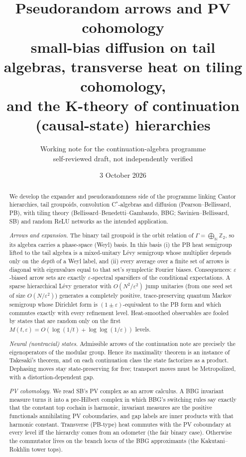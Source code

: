 \documentclass[11pt]{article}
\title{Pseudorandom arrows and PV cohomology\\[4pt]
\large small-bias diffusion on tail algebras, transverse heat on tiling cohomology,\\
and the K-theory of continuation (causal-state) hierarchies}
\author{Working note for the continuation-algebra programme\\
\small self-reviewed draft, not independently verified}
\date{3 October 2026}
\theoremstyle{definition}
\theoremstyle{remark}
\newcommand{\Z}{\mathbb Z}
\newcommand{\N}{\mathbb N}
\begin{document}
\maketitle

\begin{abstract}
We develop the expander and pseudorandomness side of the programme linking Cantor hierarchies, tail groupoids, convolution C$^*$-algebras and diffusion (Pearson--Bellissard, PB), with tiling theory (Bellissard--Benedetti--Gambaudo, BBG; Savinien--Bellissard, SB) and random ReLU networks as the intended application.

\emph{Arrows and expansion.} The binary tail groupoid is the orbit relation of $\Gamma=\bigoplus_{\N}\Z_2$, so its algebra carries a phase-space (Weyl) basis. In this basis (i) the PB heat semigroup lifted to the tail algebra is a mixed-unitary L\'evy semigroup whose multiplier depends only on the \emph{depth} of a Weyl label, and (ii) every average over a finite set of arrows is diagonal with eigenvalues equal to that set's symplectic Fourier biases. Consequences: $\varepsilon$-biased arrow sets are exactly $\varepsilon$-spectral sparsifiers of the conditional expectations. A sparse hierarchical L\'evy generator with $O(N^2/\varepsilon^2)$ jump unitaries (from one seed set of size $O(N/\varepsilon^2)$) generates a completely positive, trace-preserving quantum Markov semigroup whose Dirichlet form is $(1\pm\varepsilon)$-equivalent to the PB form and which commutes exactly with every refinement level. Heat-smoothed observables are fooled by states that are random only on the first $M(t,\varepsilon)=O(\log(1/t)+\log\log(1/\varepsilon))$ levels.

\emph{Neural (nontracial) states.} Admissible arrows of the continuation note are precisely the eigenoperators of the modular group. Hence its maximality theorem is an instance of Takesaki's theorem, and on each continuation class the state factorizes as a product. Dephasing moves stay state-preserving for free; transport moves must be Metropolized, with a distortion-dependent gap.

\emph{PV cohomology.} We read SB's PV complex as an arrow calculus. A BBG invariant measure turns it into a pre-Hilbert complex in which BBG's switching rules say exactly that the constant top cochain is harmonic, invariant measures are the positive functionals annihilating PV coboundaries, and gap labels are inner products with that harmonic constant. Transverse (PB-type) heat commutes with the PV coboundary at every level iff the hierarchy comes from an odometer (the fair binary case). Otherwise the commutator lives on the branch locus of the BBG approximants (the Kakutani--Rokhlin tower tops).


\end{abstract}
\end{document}
